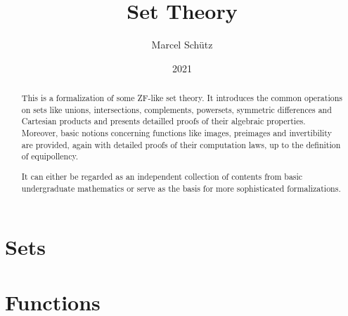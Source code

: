 \documentclass{article}
\title{Set Theory}
\author{Marcel Schütz}
\date{2021}
\begin{document}
  \maketitle

  \begin{abstract}
    This is a formalization of some ZF-like set theory.
    It introduces the common operations on sets like unions, intersections,
    complements, powersets, symmetric differences and Cartesian products and
    presents detailled proofs of their algebraic properties.
    Moreover, basic notions concerning functions like images, preimages and
    invertibility are provided, again with detailed proofs of their computation
    laws, up to the definition of equipollency.

    It can either be regarded as an independent collection of contents from
    basic undergraduate mathematics or serve as the basis for more
    sophisticated formalizations.
  \end{abstract}

  \tableofcontents

  \newpage
  \part{Sets}

  

  

  

  

  

  


  \newpage
  \part{Functions}

  

  

  

  

  

  
\end{document}
